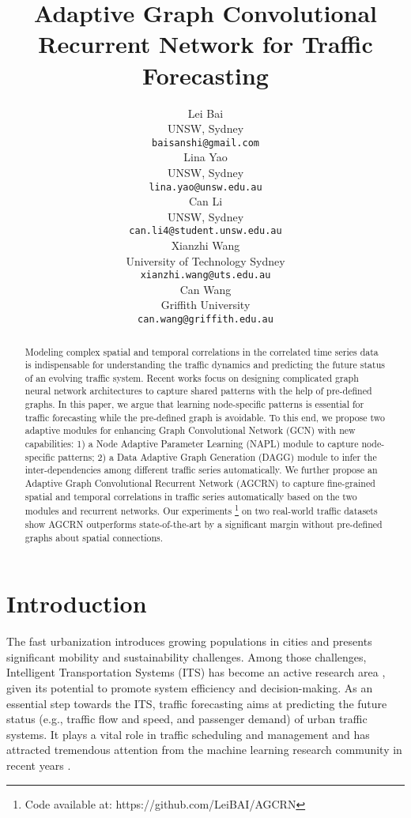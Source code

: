 \documentclass{article}
\title{Adaptive Graph Convolutional Recurrent Network for Traffic Forecasting}
\author{
  Lei Bai \\
  UNSW, Sydney\\
  \texttt{baisanshi@gmail.com} \\
  \And
  Lina Yao \\
  UNSW, Sydney \\
  \texttt{lina.yao@unsw.edu.au} \\
  \And
  Can Li \\
  UNSW, Sydney \\
  \texttt{can.li4@student.unsw.edu.au} \\
  \And
  Xianzhi Wang \\
  University of Technology Sydney \\
  \texttt{xianzhi.wang@uts.edu.au} \\
  \And
  Can Wang \\
  Griffith University \\
  \texttt{can.wang@griffith.edu.au} \\
}
\begin{document}
\maketitle

\begin{abstract}
Modeling complex spatial and temporal correlations in the correlated time series data is indispensable for understanding the traffic dynamics and predicting the future status of an evolving traffic system.
Recent works focus on designing complicated graph neural network architectures to capture shared patterns with the help of pre-defined graphs. In this paper, we argue that learning node-specific patterns is essential for traffic forecasting while the pre-defined graph is avoidable.
To this end, we propose two adaptive modules for enhancing Graph Convolutional Network (GCN) with new capabilities:
1) a Node Adaptive Parameter Learning (NAPL) module to capture node-specific patterns; 2) a Data Adaptive Graph Generation (DAGG) module to infer the inter-dependencies among different traffic series automatically.
We further propose an Adaptive Graph Convolutional Recurrent Network (AGCRN) to capture fine-grained spatial and temporal correlations in traffic series automatically based on the two modules and recurrent networks.
Our experiments \footnote{Code available at: https://github.com/LeiBAI/AGCRN} on two real-world traffic datasets show AGCRN outperforms state-of-the-art by a significant margin without pre-defined graphs about spatial connections. 



\end{abstract}

\section{Introduction}
The fast urbanization introduces growing populations in cities and presents significant mobility and sustainability challenges. Among those challenges, Intelligent Transportation Systems (ITS) has become an active research area \cite{streets-nips2019}, given its potential to promote system efficiency and decision-making. As an essential step towards the ITS, traffic forecasting aims at predicting the future status (e.g., traffic flow and speed, and passenger demand) of urban traffic systems. It plays a vital role in traffic scheduling and management and has attracted tremendous attention from the machine learning research community in recent years \cite{DCRNN,lei-ijcai2019,stgcn,graphwavenet,astgcn}. 
\end{document}
